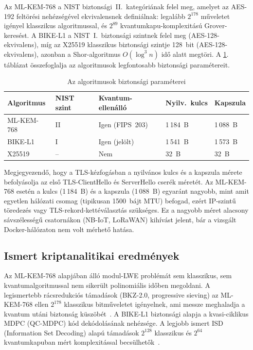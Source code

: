 Az ML-KEM-768 a NIST biztonsági~II.\ kategóriának felel meg, amelyet az AES-192 feltörési
nehézségével ekvivalensnek definiálnak: legalább $2^{178}$ műveletet igényel klasszikus
algoritmussal, és $2^{89}$ kvantumkapu-komplexitású Grover-keresést. A BIKE-L1 a NIST~I.\
biztonsági szintnek felel meg (AES-128-ekvivalens), míg az X25519 klasszikus biztonsági
szintje 128~bit (AES-128-ekvivalens), azonban a Shor-algoritmus $O(\log^3 n)$ idő alatt
megtöri. A \ref{tab:security-params}. táblázat összefoglalja az algoritmusok
legfontosabb biztonsági paramétereit.

\begin{table}[ht]
\centering
\caption{Az algoritmusok biztonsági paraméterei}
\label{tab:security-params}
\begin{tabular}{lllll}
\hline
\textbf{Algoritmus} & \textbf{NIST szint} & \textbf{Kvantum-ellenálló} & \textbf{Nyilv.\ kulcs} & \textbf{Kapszula} \\
\hline
ML-KEM-768  & II  & Igen (FIPS~203) & 1\,184~B & 1\,088~B \\
BIKE-L1     & I   & Igen (jelölt)   & 1\,541~B & 1\,573~B \\
X25519      & --  & Nem            &    32~B  &    32~B  \\
\hline
\end{tabular}
\end{table}

Megjegyezendő, hogy a TLS-kézfogásban a nyilvános kulcs és a kapszula mérete befolyásolja
az első TLS-ClientHello és ServerHello cserék méretét. Az ML-KEM-768 esetén a kulcs (1\,184~B)
és a kapszula (1\,088~B) egyaránt nagyobb, mint amit egyetlen hálózati csomag (tipikusan
1500~bájt MTU) befogad, ezért IP-szintű töredezés vagy TLS-rekord-kettéválasztás szükséges.
Ez a nagyobb méret alacsony sávszélességű csatornákon (NB-IoT, LoRaWAN) kihívást jelent,
bár a vizsgált Docker-hálózaton nem volt mérhető hatása.

\subsection{Ismert kriptanalitikai eredmények}

Az ML-KEM-768 alapjában álló modul-LWE problémát sem klasszikus, sem kvantumalgoritmussal
nem sikerült polinomiális időben megoldani. A legismertebb rácsredukciós támadások (BKZ-2.0,
progressive sieving) az ML-KEM-768 ellen $2^{178}$ klasszikus bitműveletet igényelnek,
ami messze meghaladja a kvantum utáni biztonság küszöbét~\cite{CRYSTALS-KYBER}.
A BIKE-L1 biztonsági alapja a kvasi-ciklikus MDPC (QC-MDPC) kód dekódolásának nehézsége.
A legjobb ismert ISD (Information Set Decoding) alapú támadások $2^{128}$ klasszikus
és $2^{64}$ kvantumkapuban mért komplexitással becsülhetők~\cite{BIKE-SPEC}.


